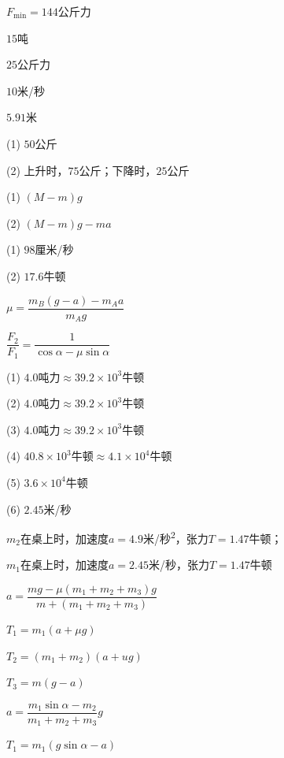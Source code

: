\achapter

\answer $ F _ { \text{min} } = 1 4 4   $公斤力

\answer $ 15 $吨

\answer $ 25 $公斤力

\answer $ 10 $米/秒

\answer $ 5.91 $米

\answer (1) $ 50 $公斤

(2) 上升时，$ 75 $公斤；下降时，$ 25 $公斤

\answer (1) $ \left( M - m \right) g  $

(2) $ \left( M - m \right) g - m a   $

\answer (1) $ 98 $厘米/秒

(2) $ 17.6 $牛顿

\answer $ \mu = \dfrac { m _ { B } \left( g - a \right) - m _ { A } a } { m _ { A } g }   $

\answer $ \dfrac { F _2 }{ F _1 } = \dfrac { 1 } { \cos \alpha - \mu \sin \alpha } $


\answer (1) $ 4.0\text{吨力} \approx 39.2 \times 10 ^ 3 \text{牛顿} $

(2) $ 4.0\text{吨力} \approx 39.2 \times 10 ^ 3 \text{牛顿} $

(3) $ 4.0\text{吨力} \approx 39.2 \times 10 ^ 3 \text{牛顿} $

(4) $ 40.8 \times 10 ^ 3 \text{牛顿} \approx 4.1 \times 10 ^ 4 \text{牛顿} $

(5) $ 3.6 \times 10 ^ 4 \text{牛顿} $

(6) $ 2.45 $米/秒

\answer $ m_2 $在桌上时，加速度$  a = 4 . 9   $米/秒\textsuperscript{2}，张力$  T = 1 . 4 7   $牛顿；

$ m_1 $在桌上时，加速度$  a = 2 . 4 5   $米/秒，张力$ T=1.47 $牛顿

\answer $ a = \dfrac { m g - \mu \left( m _ { 1 } + m _ { 2 } + m _ { 3 } \right) g } { m + \left( m _ { 1 } + m _ { 2 } + m _ { 3 } \right) }   $

$ T _ { 1 } = m _ { 1 } \left( a + \mu g \right)  $

$ T _ { 2 } = \left( m _ { 1 } + m _ { 2 } \right) \left( a + u g \right)  $

$ T _ { 3 } = m \left( g - a \right) $

\answer $ a = \dfrac { m _ { 1 } \sin \alpha -m _ { 2 } } { m _ { 1 } + m _ { 2 } + m _ { 3 } } g  $

$ T _ { 1 } = m _ { 1 } \left( g \sin \alpha - a \right)   $

